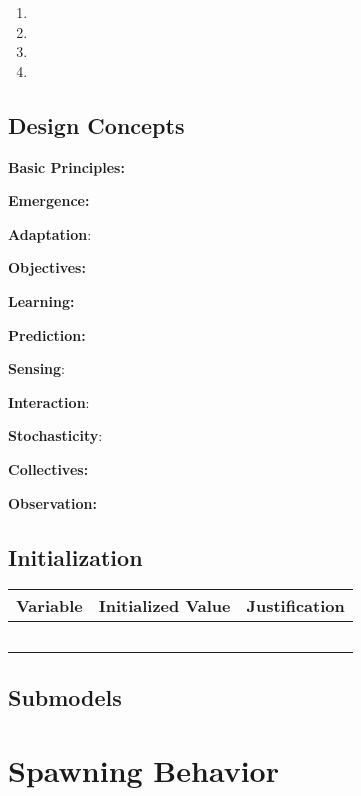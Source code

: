 \documentclass[
]{book}
\providecommand{\tightlist}{%
  \setlength{\itemsep}{0pt}\setlength{\parskip}{0pt}}
\begin{document}
\begin{enumerate}
\def\labelenumi{\arabic{enumi}.}
\tightlist
\item
\item
\item
\item
\end{enumerate}

\section{Design Concepts}\label{design-concepts-9}

\textbf{Basic Principles:}

\textbf{Emergence:}

\textbf{Adaptation}:

\textbf{Objectives:}

\textbf{Learning:}

\textbf{Prediction:}

\textbf{Sensing}:

\textbf{Interaction}:

\textbf{Stochasticity}:

\textbf{Collectives:}

\textbf{Observation:}

\section{Initialization}\label{initialization-9}

\begin{longtable}[]{@{}ccc@{}}
\toprule\noalign{}
Variable & Initialized Value & Justification \\
\midrule\noalign{}
\endhead
\bottomrule\noalign{}
\endlastfoot
& & \\
& & \\
& & \\
& & \\
& & \\
\end{longtable}

\section{Submodels}\label{submodels-9}

\chapter{Spawning Behavior}\label{spawning-behavior}
\end{document}

